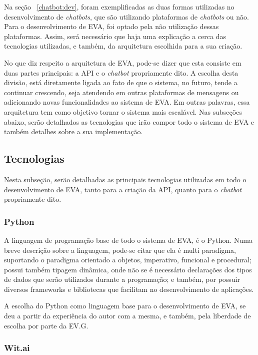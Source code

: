 Na seção ~\ref{chatbot:dev}, foram exemplificadas as duas formas utilizadas no desenvolvimento de \textit{chatbots}, que são utilizando plataformas de \textit{chatbots} ou não. Para o desenvolvimento de EVA, foi optado pela não utilização dessas plataformas. Assim, será necessário que haja uma explicação a cerca das tecnologias utilizadas, e também, da arquitetura escolhida para a sua criação.

No que diz respeito a arquitetura de EVA, pode-se dizer que esta consiste em duas partes principais: a API e o \textit{chatbot} propriamente dito. A escolha desta divisão, está diretamente ligada ao fato de que o sistema, no futuro, tende a continuar crescendo, seja atendendo em outras plataformas de mensagens ou adicionando novas funcionalidades ao sistema de EVA. Em outras palavras, essa arquitetura tem como objetivo tornar o sistema mais escalável. Nas subseções abaixo, serão detalhados as tecnologias que irão compor todo o sistema de EVA e também detalhes sobre a sua implementação.

\subsection{Tecnologias}

Nesta subseção, serão detalhadas as principais tecnologias utilizadas em todo o desenvolvimento de EVA, tanto para a criação da API, quanto para o \textit{chatbot} propriamente dito.

\subsubsection{Python}

A linguagem de programação base de todo o sistema de EVA, é o Python. Numa breve descrição sobre a linguagem, pode-se citar que ela é multi paradigma, suportando o paradigma orientado a objetos, imperativo, funcional e procedural; possui também tipagem dinâmica, onde não se é necessário declarações dos tipos de dados que serão utilizados durante a programação; e também, por possuir diversos frameworks e bibliotecas que facilitam no desenvolvimento de aplicações.

A escolha do Python como linguagem base para o desenvolvimento de EVA, se deu a partir da experiência do autor com a mesma, e também, pela liberdade de escolha por parte da EV.G.

\subsubsection{Wit.ai}

